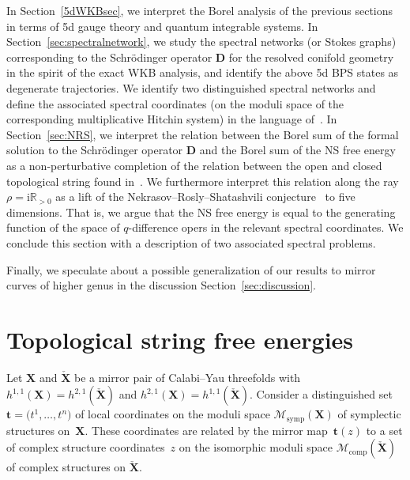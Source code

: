 \documentclass[pdftex]{sigma}
\numberwithin{equation}{section}
\begin{document}
In Section~\ref{5dWKBsec}, we interpret the Borel analysis of the previous sections in terms of 5d gauge theory and quantum integrable systems. In Section~\ref{sec:spectralnetwork}, we study the spectral networks (or Stokes graphs) corresponding to the Schr\"odinger operator $\mathbf{D}$ for the resolved conifold geometry in the spirit of the exact WKB analysis, and identify the above 5d BPS states as degenerate trajectories. We identify two distinguished spectral networks and define the associated spectral coordinates (on the moduli space of the corresponding multiplicative Hitchin system) in the language of~\cite{Hollands:2013qza}. In Section~\ref{sec:NRS}, we interpret the relation between the Borel sum of the formal solution to the Schr\"odinger operator $\mathbf{D}$ and the Borel sum of the NS free energy as a non-perturbative completion of the relation between the open and closed topological string found in~\cite{ACDKV}. We furthermore interpret this relation along the ray $\rho = \mathrm{i} \mathbb{R}_{>0}$ as a lift of the Nekrasov--Rosly--Shatashvili conjecture~\cite{Nekrasov:NRS} to five dimensions. That is, we argue that the NS free energy is equal to the generating function of the space of $q$-difference opers in the relevant spectral coordinates. We conclude this section with a description of two associated spectral problems.

Finally, we speculate about a possible generalization of our results to mirror curves of higher genus in the discussion Section~\ref{sec:discussion}.

\section{Topological string free energies}\label{sec:freeenergies}

Let $\mathbf{X}$ and $\check{\mathbf{X}}$ be a mirror pair of Calabi--Yau threefolds with $h^{1,1}(\mathbf{X})=h^{2,1}(\check{\mathbf{X}})$ and $h^{2,1}(\mathbf{X})=h^{1,1}(\check{\mathbf{X}})$. Consider a distinguished set $\mathbf{t}=\big(t^1,\dots,t^n\big)$ of local coordinates on the moduli space $\mathcal{M}_\mathrm{symp}(\mathbf{X})$ of symplectic structures on~$\mathbf{X}$. These coordinates are related by the mirror map~$\mathbf{t}(z)$ to a set of complex structure coordinates~$z$ on the isomorphic moduli space $\mathcal{M}_\mathrm{comp}(\check{\mathbf{X}})$ of complex structures on $\check{\mathbf{X}}$.
\end{document}
